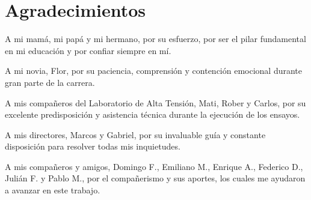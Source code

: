 \newpage
\chapter*{Agradecimientos}


A mi mamá, mi papá y mi hermano, por su esfuerzo, por ser el pilar fundamental en mi educación y por confiar siempre en mí.

A mi novia, Flor, por su paciencia, comprensión y contención emocional durante gran parte de la carrera.

A mis compañeros del Laboratorio de Alta Tensión, Mati, Rober y Carlos, por su excelente predisposición y asistencia técnica durante la ejecución de los ensayos.

A mis directores, Marcos y Gabriel, por su invaluable guía y constante disposición para resolver todas mis inquietudes.

A mis compañeros y amigos, Domingo F., Emiliano M., Enrique A., Federico D., Julián F. y Pablo M., por el compañerismo y sus aportes, los cuales me ayudaron a avanzar en este trabajo.